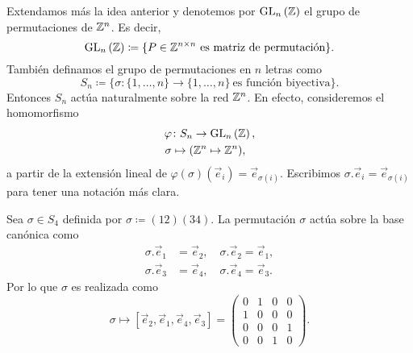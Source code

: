 Extendamos más la idea anterior y denotemos por $\operatorname{GL}_{n}\left(\mathbb{Z}\right)$ el grupo de permutaciones de $\mathbb{Z}^n$.
Es decir,
\begin{equation*}
	\operatorname{GL}_{n}\left(\mathbb{Z}\right) \coloneq \lbrace P \in \mathbb{Z}^{n \times n} ~\text{es matriz de
	permutación} \rbrace.
\end{equation*}
También definamos el grupo de permutaciones en $n$ letras como
\begin{equation*}
	S_n \coloneq \lbrace \sigma \colon \lbrace 1, \ldots, n \rbrace \to \lbrace
	1, \ldots, n \rbrace ~\text{es función biyectiva} \rbrace.
\end{equation*}
Entonces $S_n$ actúa naturalmente sobre la red $\mathbb{Z}^n$. En efecto, consideremos el homomorfismo
\begin{align*}
	\varphi &\colon S_n \to \operatorname{GL}_{n}\left(\mathbb{Z}\right),\\
	\sigma &\mapsto (\mathbb{Z}^n \mapsto \mathbb{Z}^n),
\end{align*}
a partir de la extensión lineal de $\varphi(\sigma)(\vec{e}_i) = \vec{e}_{\sigma(i)}$. Escribimos
$\sigma.\vec{e}_i = \vec{e}_{\sigma(i)}$ para tener una notación más clara.
\begin{example}
	Sea $\sigma \in S_4$ definida por $\sigma \coloneq (12)(34)$. La permutación $\sigma$ actúa
	sobre la base canónica como
	\begin{align*}
		\sigma.\vec{e}_1 &= \vec{e}_2, \quad \sigma.\vec{e}_2 = \vec{e}_1, \\
		\sigma.\vec{e}_3 &= \vec{e}_4, \quad \sigma.\vec{e}_4 = \vec{e}_3.
	\end{align*}
	Por lo que $\sigma$ es realizada como
	\begin{equation*}
		\sigma \mapsto [\vec{e}_2, \vec{e}_1, \vec{e}_4, \vec{e}_3]
		= \begin{pmatrix}
			0 & 1 & 0 & 0 \\
			1 & 0 & 0 & 0 \\
			0 & 0 & 0 & 1 \\
			0 & 0 & 1 & 0
		\end{pmatrix}.
	\end{equation*}
\end{example}

